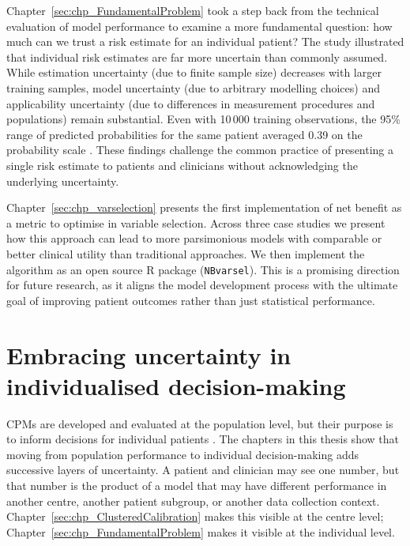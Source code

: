 Chapter~\ref{sec:chp_FundamentalProblem} took a step back from the technical evaluation of model performance to examine a more fundamental question: how much can we trust a risk estimate for an individual patient? The study illustrated that individual risk estimates are far more uncertain than commonly assumed. While estimation uncertainty (due to finite sample size) decreases with larger training samples, model uncertainty (due to arbitrary modelling choices) and applicability uncertainty (due to differences in measurement procedures and populations) remain substantial. Even with 10\,000 training observations, the 95\% range of predicted probabilities for the same patient averaged 0.39 on the probability scale \cite{barrenadaFundamentalProblemRisk2025}. These findings challenge the common practice of presenting a single risk estimate to patients and clinicians without acknowledging the underlying uncertainty.

Chapter~\ref{sec:chp_varselection} presents the first implementation of net benefit as a metric to optimise in variable selection. Across three case studies we present how this approach can lead to more parsimonious models with comparable or better clinical utility than traditional approaches. We then implement the algorithm as an open source R package (\texttt{NBvarsel}). This is a promising direction for future research, as it aligns the model development process with the ultimate goal of improving patient outcomes rather than just statistical performance.



\section{Embracing uncertainty in individualised decision-making}

\glspl{CPM} are developed and evaluated at the population level, but their purpose is to inform decisions for individual patients \cite{steyerbergClinicalPredictionModels2009}. The chapters in this thesis show that moving from population performance to individual decision-making adds successive layers of uncertainty. A patient and clinician may see one number, but that number is the product of a model that may have different performance in another centre, another patient subgroup, or another data collection context. Chapter~\ref{sec:chp_ClusteredCalibration} makes this visible at the centre level; Chapter~\ref{sec:chp_FundamentalProblem} makes it visible at the individual level. 

